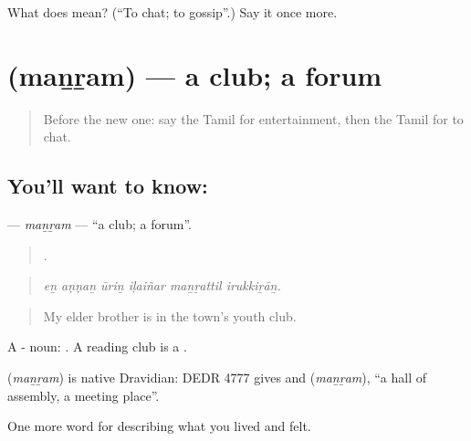 \begin{tcolorbox}[breakable,colback=teal!4,colframe=teal!35!black,title={Before you move on}]
What does   mean? (\textquotedblleft{}To chat; to gossip\textquotedblright{}.) Say it once more.
\end{tcolorbox}
\section[\texorpdfstring{\ta{மன்றம்} (maṉṟam)}{மன்றம் (maṉṟam)}]{ (maṉṟam) — a club; a forum}

\label{lesson:TA-C527-manram}



\begin{quote}
Before the new one: say the Tamil for entertainment, then the Tamil for to chat.
\end{quote}

\subsection*{You'll want to know: }
\textbf{} — \emph{maṉṟam} — \textquotedblleft{}a club; a forum\textquotedblright{}.

\begin{quote}
     .
\end{quote}

\begin{quote}
\emph{eṉ aṇṇaṉ ūriṉ iḷaiñar maṉṟattil irukkiṟāṉ.}
\end{quote}

\begin{quote}
My elder brother is in the town's youth club.
\end{quote}

A - noun: . A reading club is a  .

\begin{cousinweb}
\textbf{} (\emph{maṉṟam}) is native Dravidian: DEDR 4777 gives  and  (\emph{maṉṟam}), \textquotedblleft{}a hall of assembly, a meeting place\textquotedblright{}.
\end{cousinweb}

\begin{grammarlens}[title={What you've built}]
One more word for describing what you lived and felt.
\end{grammarlens}

